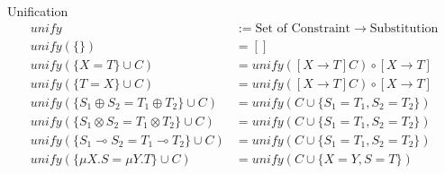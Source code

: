 \documentclass[10pt]{jsarticle}
\begin{document}
\begin{itembox}[c]{Unification}
  \begin{align*}
      unify    &:= \text{Set of Constraint} \rightarrow \text{Substitution} \\
      unify(\{\})             &= [] \\
      unify(\{X = T\} \cup C) &= unify([X \rightarrow T]C) \circ [X \rightarrow T] \\
      unify(\{T = X\} \cup C) &= unify([X \rightarrow T]C) \circ [X \rightarrow T] \\
      unify(\{S_1 \oplus S_2 = T_1 \oplus T_2\} \cup C) &= unify(C \cup \{S_1 = T_1, S_2 = T_2\}) \\
      unify(\{S_1 \otimes S_2 = T_1 \otimes T_2\} \cup C) &= unify(C \cup \{S_1 = T_1, S_2 = T_2\}) \\
      unify(\{S_1 \multimap S_2 = T_1 \multimap T_2\} \cup C) &= unify(C \cup \{S_1 = T_1, S_2 = T_2\}) \\
      unify(\{\mu{X}.S = \mu{Y}.T\} \cup C) &= unify(C \cup \{X = Y, S = T\}) 
  \end{align*}
\end{itembox}

\newpage
\end{document}
